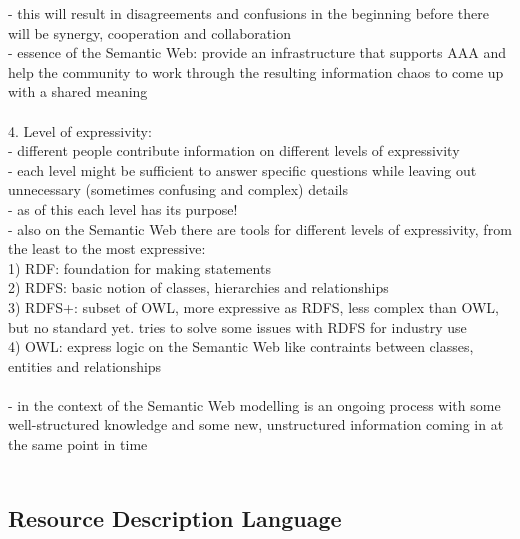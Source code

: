 - this will result in disagreements and confusions in the beginning before there will be synergy, cooperation and collaboration \\
- essence of the Semantic Web: provide an infrastructure that supports AAA and help the community to work through the resulting information chaos
to come up with a shared meaning \\
\\
4. Level of expressivity: \\
- different people contribute information on different levels of expressivity \\
- each level might be sufficient to answer specific questions while leaving out unnecessary (sometimes confusing and complex) details \\
- as of this each level has its purpose! \\
- also on the Semantic Web there are tools for different levels of expressivity, from the least to the most expressive: \\
   1) RDF: foundation for making statements \\
	 2) RDFS: basic notion of classes, hierarchies and relationships \\
	 3) RDFS+: subset of OWL, more expressive as RDFS, less complex than OWL, but no standard yet. tries to solve some issues with RDFS for
	    industry use \\
	 4) OWL: express logic on the Semantic Web like contraints between classes, entities and relationships \\
\\
- in the context of the Semantic Web modelling is an ongoing process with some well-structured knowledge and some new, unstructured information
coming in at the same point in time \\
\\


\subsection{Resource Description Language}
\label{sec:semantic_rdl}

